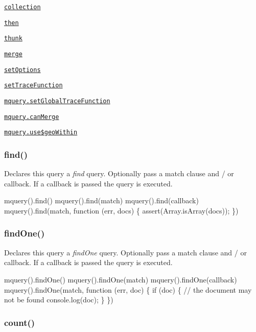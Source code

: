 \begin{DoxyItemize}
\item \href{#collection}{\tt collection}
\item \href{#then}{\tt then}
\item \href{#thunk}{\tt thunk}
\item \href{#mergeobject}{\tt merge}
\item \href{#setoptionsoptions}{\tt set\+Options}
\item \href{#settracefunctionfunc}{\tt set\+Trace\+Function}
\item \href{#mquerysetglobaltracefunctionfunc}{\tt mquery.\+set\+Global\+Trace\+Function}
\item \href{#mquerycanmerge}{\tt mquery.\+can\+Merge}
\item \href{#mqueryusegeowithin}{\tt mquery.\+use\$geo\+Within}
\end{DoxyItemize}

\subsubsection*{find()}

Declares this query a {\itshape find} query. Optionally pass a match clause and / or callback. If a callback is passed the query is executed.


\begin{DoxyCode}
mquery().find()
mquery().find(match)
mquery().find(callback)
mquery().find(match, function (err, docs) \{
  assert(Array.isArray(docs));
\})
\end{DoxyCode}


\subsubsection*{find\+One()}

Declares this query a {\itshape find\+One} query. Optionally pass a match clause and / or callback. If a callback is passed the query is executed.


\begin{DoxyCode}
mquery().findOne()
mquery().findOne(match)
mquery().findOne(callback)
mquery().findOne(match, function (err, doc) \{
  if (doc) \{
    // the document may not be found
    console.log(doc);
  \}
\})
\end{DoxyCode}


\subsubsection*{count()}

